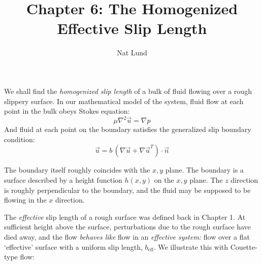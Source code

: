 \documentclass[a4paper]{report}
\title{Chapter 6: The Homogenized Effective Slip Length}
\author{Nat Lund}
\newcommand{\beff}{\ensuremath{b_{\mathrm{eff}}}}
\begin{document}
\maketitle

We shall find the \emph{homogenized slip length} of a bulk of fluid flowing over a rough slippery surface.  In our mathematical model of the system,
fluid flow at each point in the bulk obeys Stokes equation:
\begin{equation}
\mu \nabla^2 \vec{u} = \nabla p
\end{equation}
And fluid at each point on the boundary satisfies the generalized slip boundary condition:
\begin{equation}
\vec{u} = b \, (\nabla \vec{u} + \nabla \vec{u}^T) \cdot \vec{n}
\end{equation}

The boundary itself roughly coincides with the $x,y$ plane. The boundary is a surface described by a height function $h(x,y)$ on the $x,y$ plane.  The $z$ direction is roughly perpendicular to the boundary, and the fluid may be supposed to be flowing in the $x$ direction. 

\begin{center}
\end{center}

The \emph{effective} slip length of a rough surface was defined back in Chapter 1.  At sufficient height above the surface, perturbations due to the rough surface have died away, and the flow \emph{behaves like} flow in an \emph{effective system:} flow over a flat `effective' surface with a uniform slip length, $\beff$. We illustrate this with Couette-type flow:
\end{document}
